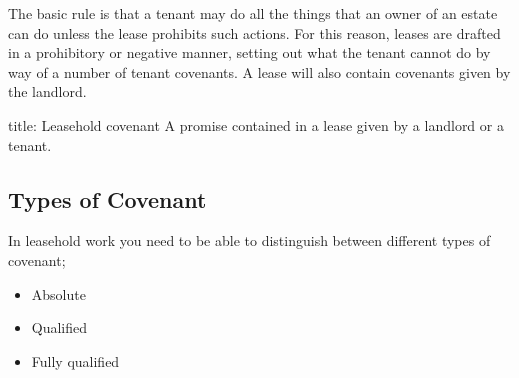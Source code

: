 \documentclass[
]{article}
\newenvironment{Shaded}{}{}
\newcommand{\NormalTok}[1]{#1}
\providecommand{\tightlist}{%
  \setlength{\itemsep}{0pt}\setlength{\parskip}{0pt}}
\begin{document}
The basic rule is that a tenant may do all the things that an owner of
an estate can do unless the lease prohibits such actions. For this
reason, leases are drafted in a prohibitory or negative manner, setting
out what the tenant cannot do by way of a number of tenant covenants. A
lease will also contain covenants given by the landlord.

\begin{Shaded}
\begin{Highlighting}[]
\NormalTok{title: Leasehold covenant}
\NormalTok{A promise contained in a lease given by a landlord or a tenant.}
\end{Highlighting}
\end{Shaded}

\hypertarget{types-of-covenant}{%
\subsection{Types of Covenant}\label{types-of-covenant}}

In leasehold work you need to be able to distinguish between different
types of covenant;

\begin{itemize}
\tightlist
\item
  Absolute
\item
  Qualified
\item
  Fully qualified
\end{itemize}
\end{document}
